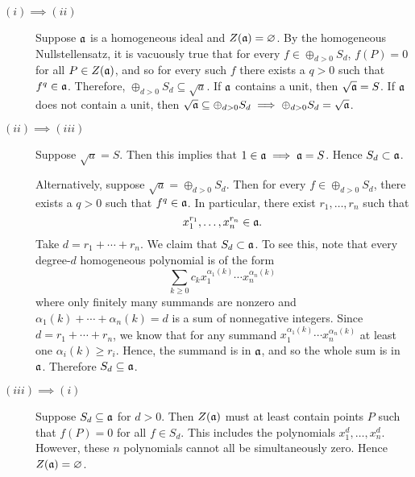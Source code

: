 \documentclass[10pt]{amsart}
\begin{document}
\begin{solution}
    \begin{luke}
        \begin{description}
            \item[$(i) \implies (ii)$] 
            Suppose $\mathfrak{a}$ is a homogeneous ideal and $Z(\mathfrak{a}) = \varnothing$. By the 
            homogeneous Nullstellensatz, it is vacuously true that for every 
            $f \in \oplus_{d > 0}S_d$, $f(P) = 0$ for all $P \in Z(\mathfrak{a})$, and so 
            for every such $f$ there exists a $q > 0$ such that $f^q \in \mathfrak{a}$. 
            Therefore, $\oplus_{d > 0}S_d \subseteq \sqrt{a}$. If $\mathfrak{a}$ contains 
            a unit, then $\sqrt{\mathfrak{a}} = S$. If $\mathfrak{a}$ does not contain a unit, then 
            $\sqrt{\mathfrak{a}} \subseteq \oplus_{d > 0}S_d \implies \oplus_{d > 0}S_d = \sqrt{\mathfrak{a}}$.
    
            \item[$(ii) \implies (iii)$] 
            Suppose $\sqrt{a} = S$. Then this implies that $1 \in \mathfrak{a} \implies \mathfrak{a} = S$. Hence $S_d \subset \mathfrak{a}$.
    
            Alternatively, suppose $\sqrt{a} = \oplus_{d > 0}S_d$. Then for every $f \in \oplus_{d > 0}S_d$, 
            there exists a $q > 0$ such that $f^q \in \mathfrak{a}$. In particular, there 
            exist $r_1, \dots, r_n$ such that 
            \[
                x_1^{r_1}, \dots, x_n^{r_n} \in \mathfrak{a}.
            \]
            Take $d = r_1 + \cdots + r_n$. We claim that $S_d \subset \mathfrak{a}$. 
            To see this, note that every degree-$d$ homogeneous polynomial is of the form 
            \[
                \sum_{k \ge 0}c_k x_1^{\alpha_1(k)} \cdots  x_n^{\alpha_n(k)}
            \]
            where only finitely many summands are nonzero and $\alpha_1(k) + \cdots + \alpha_n(k) = d$ is a sum 
            of nonnegative integers. Since 
            $d = r_1 + \cdots + r_n$, we know that for any summand $x_1^{\alpha_1(k)} \cdots  x_n^{\alpha_n(k)}$
            at least one $\alpha_i(k) \ge r_i$. Hence, the summand is in $\mathfrak{a}$, and so the whole 
            sum is in $\mathfrak{a}$. Therefore $S_d \subseteq \mathfrak{a}$. 
    
            \item[$(iii) \implies (i)$] 
            Suppose $S_d \subseteq \mathfrak{a}$ for $d > 0$. Then $Z(\mathfrak{a})$ must 
            at least contain points $P$ such that $f(P) = 0$ for all $f \in S_d$.
            This includes the polynomials $x_1^d, \dots, x_n^d$. However, these $n$ polynomials 
            cannot all be simultaneously zero. Hence $Z(\mathfrak{a}) = \varnothing$. 
        

\end{description}
\end{luke}
\end{solution}
\end{document}
